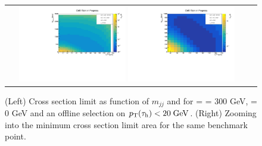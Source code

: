 \begin{figure}[tbh!]
	\centering
	\begin{tabular}{cc}
		\includegraphics[width=0.45\textwidth]{analysis/pics/JetInvMass_vs_MET_xsec_chi300_lsp000_taupt20.pdf}
		\includegraphics[width=0.45\textwidth]{analysis/pics/JetInvMass_vs_MET_xsec_chi300_lsp000_taupt20_zoom.pdf} 		
	\end{tabular}
	\caption{(Left) Cross section limit as function of $m_{jj}$ and \met for \charginopm = \neutralinotwo = 300 GeV, \neutralinoone = 0 GeV and an offline selection on $p_{\text{T}}(\tau_{\text{h}}) <  20\;\text{Ge}\kern-0.06667em\text{V}$. (Right) Zooming into the minimum cross section limit area for the same benchmark point.}
	\label{fig::JetInvMass_vs_MET_xsec_chi300_lsp000_taupt20}
\end{figure}

